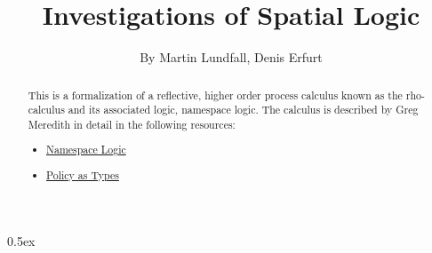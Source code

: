 \documentclass[11pt,a4paper]{article}
\begin{document}
\title{Investigations of Spatial Logic}
\author{By Martin Lundfall, Denis Erfurt}
\maketitle

\begin{abstract}
  This is a formalization of a reflective, higher order process calculus known as the
  rho-calculus and its associated logic, namespace logic.
  The calculus is described by Greg Meredith in detail in the following resources:\\
  \begin{itemize}
  \item \href{http://www.lshift.net/downloads/ex_nihilo_logic.pdf}{Namespace Logic}
  \item \href{https://arxiv.org/pdf/1307.7766v2.pdf}{Policy as Types}
  \end{itemize}
\end{abstract}
\newpage
\tableofcontents

\parindent 0pt\parskip 0.5ex



%
%
\end{document}
